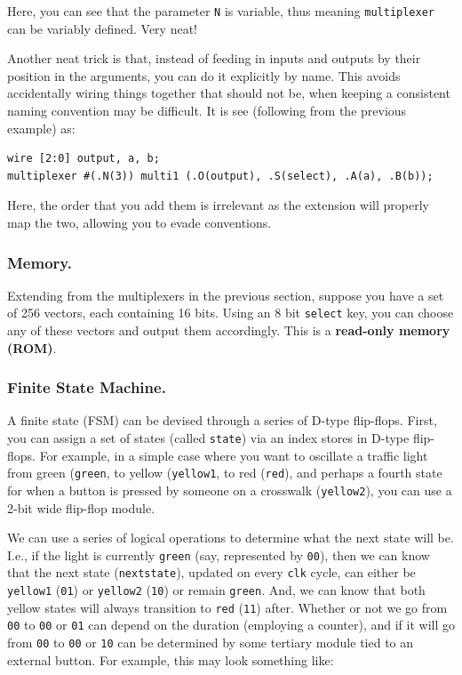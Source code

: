 Here, you can see that the parameter \texttt{N} is variable, thus meaning \texttt{multiplexer} can be variably defined. Very neat!\newline

Another neat trick is that, instead of feeding in inputs and outputs by their position in the arguments, you can do it explicitly by name. This avoids accidentally wiring things together that should not be, when keeping a consistent naming convention may be difficult. It is see (following from the previous example) as: 

\bs 
\begin{lstlisting}
wire [2:0] output, a, b; 
multiplexer #(.N(3)) multi1 (.O(output), .S(select), .A(a), .B(b)); 
\end{lstlisting}
\bs

Here, the order that you add them is irrelevant as the extension will properly map the two, allowing you to evade conventions.\newline

\subsubsection{Memory.}

Extending from the multiplexers in the previous section, suppose you have a set of 256 vectors, each containing 16 bits. Using an 8 bit \texttt{select} key, you can choose any of these vectors and output them accordingly. This is a \textbf{read-only memory (ROM)}. 



\subsubsection{Finite State Machine.}


A finite state (FSM) can be devised through a series of D-type flip-flops. First, you can assign a set of states (called \texttt{state}) via an index stores in D-type flip-flops. For example, in a simple case where you want to oscillate a traffic light from green (\texttt{green}, to yellow (\texttt{yellow1}, to red (\texttt{red}), and perhaps a fourth state for when a button is pressed by someone on a crosswalk (\texttt{yellow2}), you can use a 2-bit wide flip-flop module.\newline

We can use a series of logical operations to determine what the next state will be. I.e., if the light is currently \texttt{green} (say, represented by \texttt{00}), then we can know that the next state (\texttt{nextstate}), updated on every \texttt{clk} cycle, can either be \texttt{yellow1} (\texttt{01}) or \texttt{yellow2} (\texttt{10}) or remain \texttt{green}. And, we can know that both yellow states will always transition to \texttt{red} (\texttt{11}) after. Whether or not we go from \texttt{00} to \texttt{00} or \texttt{01} can depend on the duration (employing a counter), and if it will go from \texttt{00} to \texttt{00} or \texttt{10} can be determined by some tertiary module tied to an external button. For example, this may look something like: 

